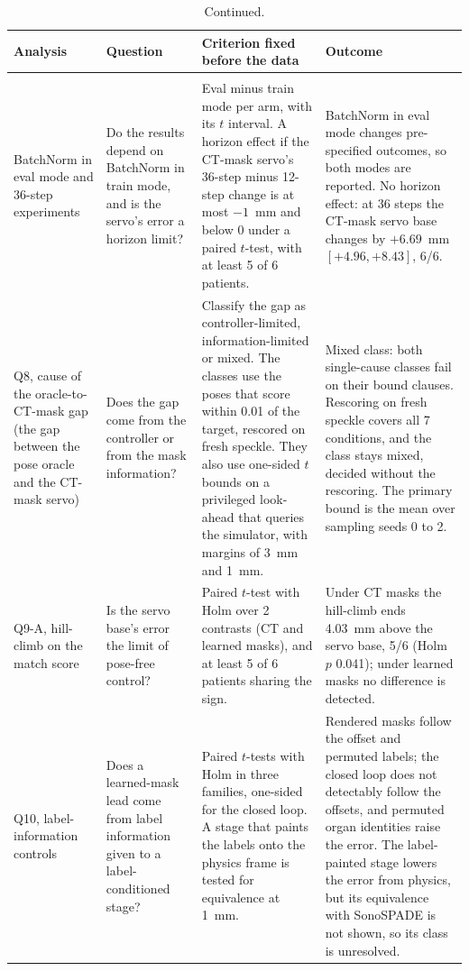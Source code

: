 \begin{table}[tp]
\renewcommand{\baselinestretch}{1}\scriptsize
\ContinuedFloat
\caption[]{Continued.}
\centering
\setlength{\tabcolsep}{4pt}
\begin{tabularx}{\textwidth}{@{}>{\raggedright\arraybackslash}p{} >{\raggedright\arraybackslash\hsize=0.75\hsize}X >{\raggedright\arraybackslash\hsize=1.25\hsize}X >{\raggedright\arraybackslash}X@{}}
\toprule
Analysis & Question & Criterion fixed before the data & Outcome \\
\midrule
\multicolumn{4}{@{}l}{\textit{Exploratory tests}} \\
BatchNorm in eval mode and 36-step experiments & Do the results depend on BatchNorm in train mode, and is the servo's error a horizon limit? & Eval minus train mode per arm, with its $t$ interval. A horizon effect if the CT-mask servo's 36-step minus 12-step change is at most $-1$~mm and below 0 under a paired $t$-test, with at least 5 of 6 patients. & BatchNorm in eval mode changes pre-specified outcomes, so both modes are reported. No horizon effect: at 36 steps the CT-mask servo base changes by $+6.69$~mm $[+4.96, +8.43]$, 6/6. \\[2pt]
Q8, cause of the oracle-to-CT-mask gap (the gap between the pose oracle and the CT-mask servo) & Does the gap come from the controller or from the mask information? & Classify the gap as controller-limited, information-limited or mixed. The classes use the poses that score within 0.01 of the target, rescored on fresh speckle. They also use one-sided $t$ bounds on a privileged look-ahead that queries the simulator, with margins of 3~mm and 1~mm. & Mixed class: both single-cause classes fail on their bound clauses. Rescoring on fresh speckle covers all 7 conditions, and the class stays mixed, decided without the rescoring. The primary bound is the mean over sampling seeds 0 to 2. \\[2pt]
Q9-A, hill-climb on the match score & Is the servo base's error the limit of pose-free control? & Paired $t$-test with Holm over 2 contrasts (CT and learned masks), and at least 5 of 6 patients sharing the sign. & Under CT masks the hill-climb ends 4.03~mm above the servo base, 5/6 (Holm $p$ 0.041); under learned masks no difference is detected. \\[2pt]
Q10, label-information controls & Does a learned-mask lead come from label information given to a label-conditioned stage? & Paired $t$-tests with Holm in three families, one-sided for the closed loop. A stage that paints the labels onto the physics frame is tested for equivalence at 1~mm. & Rendered masks follow the offset and permuted labels; the closed loop does not detectably follow the offsets, and permuted organ identities raise the error. The label-painted stage lowers the error from physics, but its equivalence with SonoSPADE is not shown, so its class is unresolved. \\[2pt]

\end{tabularx}
\end{table}
